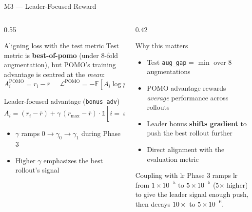 \documentclass[aspectratio=169,11pt]{beamer}
\begin{document}
\begin{frame}{M3 --- Leader-Focused Reward}
  \begin{columns}[T,totalwidth=\textwidth]
    \begin{column}{0.55\textwidth}
      \begin{block}{Aligning loss with the test metric}
        Test metric is \textbf{best-of-pomo} (under 8-fold augmentation),
        but POMO's training advantage is centred at the \emph{mean}:
        $$
          A_i^{\text{POMO}} = r_i - \bar{r}
          \;\;\;\;\;
          \mathcal{L}^{\text{POMO}} = -\mathbb{E}\!\left[A_i \log p_i\right]
        $$
      \end{block}
      \begin{block}{Leader-focused advantage (\texttt{bonus\_adv})}
        $$
          A_i = (r_i - \bar{r}) + \gamma\,(r_{\max} - \bar{r})\cdot
          \mathbb{1}\!\left[i = \arg\max_j r_j\right]
        $$
        \begin{itemize}
          \item $\gamma$ ramps $0 \!\to\! \gamma_0 \!\to\! \gamma_1$ during Phase 3
          \item Higher $\gamma$ emphasizes the best rollout's signal
        \end{itemize}
      \end{block}
    \end{column}
    \begin{column}{0.42\textwidth}
      \begin{block}{Why this matters}
        \begin{itemize}\setlength{\itemsep}{2pt}
          \item Test \texttt{aug\_gap} = $\min$ over 8 augmentations
          \item POMO advantage rewards \emph{average} performance across rollouts
          \item Leader bonus \textbf{shifts gradient} to push the best rollout further
          \item Direct alignment with the evaluation metric
        \end{itemize}
      \end{block}
      \begin{alertblock}{Coupling with lr}
        Phase 3 ramps lr from $1\!\times\!10^{-5}$ to $5\!\times\!10^{-5}$
        (5$\times$ higher) to give the leader signal enough push,
        then decays $10\times$ to $5\!\times\!10^{-6}$.
      \end{alertblock}
    \end{column}
  \end{columns}
\end{frame}
\end{document}
